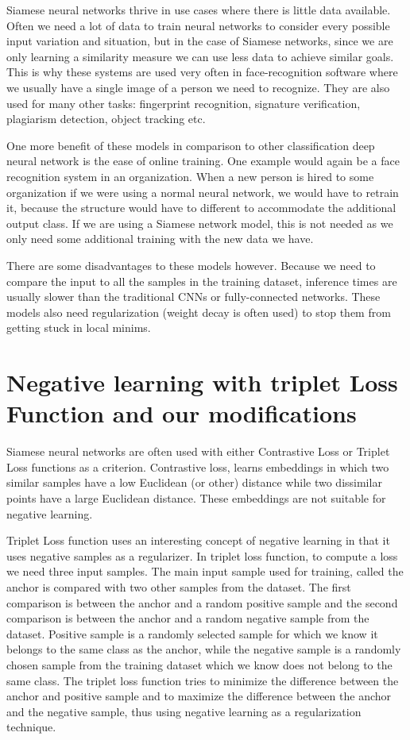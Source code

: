 \documentclass[b5paper]{book}
\begin{document}
Siamese neural networks thrive in use cases where there is little data available. Often we need a lot of data to train neural networks to consider every possible input variation and situation, but in the case of Siamese networks, since we are only learning a similarity measure we can use less data to achieve similar goals. This is why these systems are used very often in face-recognition software where we usually have a single image of a person we need to recognize. They are also used for many other tasks: fingerprint recognition, signature verification, plagiarism detection, object tracking etc.

One more benefit of these models in comparison to other classification deep neural network is the ease of online training. One example would again be a face recognition system in an organization. When a new person is hired to some organization if we were using a normal neural network, we would have to retrain it, because the structure would have to different to accommodate the additional output class. If we are using a Siamese network model, this is not needed as we only need some additional training with the new data we have. 

There are some disadvantages to these models however. Because we need to compare the input to all the samples in the training dataset, inference times are usually slower than the traditional CNNs or fully-connected networks. These models also need regularization (weight decay is often used) to stop them from getting stuck in local minims. 

\section{Negative learning with triplet Loss Function and our modifications}

Siamese neural networks are often used with either Contrastive Loss or Triplet Loss functions as a criterion. Contrastive loss, learns embeddings in which two similar samples have a low Euclidean (or other) distance while two dissimilar points have a large Euclidean distance. These embeddings are not suitable for negative learning.

Triplet Loss function uses an interesting concept of negative learning in that it uses negative samples as a regularizer. In triplet loss function, to compute a loss we need three input samples. The main input sample used for training, called the anchor is compared with two other samples from the dataset. The first comparison is between the anchor and a random positive sample and the second comparison is between the anchor and a random negative sample from the dataset. Positive sample is a randomly selected sample for which we know it belongs to the same class as the anchor, while the negative sample is a randomly chosen sample from the training dataset which we know does not belong to the same class. The triplet loss function tries to minimize the difference between the anchor and positive sample and to maximize the difference between the anchor and the negative sample, thus using negative learning as a regularization technique.
\end{document}
